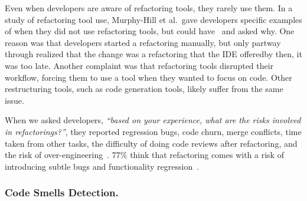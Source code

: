 \documentclass[runningheads,a4paper]{llncs}
\begin{document}
Even when developers are aware of refactoring tools, they rarely use them.  In a study of refactoring tool use, Murphy-Hill et al.~gave developers specific examples of when they did not use refactoring tools, but could have~\cite{Murphy-Hill2012:refactor} and asked why. One reason was that developers started a refactoring manually, but only partway through realized that the change was a refactoring that the IDE offered\textemdash by then, it was too late.  Another complaint was that refactoring tools disrupted their workflow, forcing them to use a tool when they wanted to focus on code.  Other restructuring tools, such as code generation tools, likely suffer from the same issue.  

When we asked developers, {\it ``based on your experience, what are the risks involved in refactorings?''}, they reported regression bugs, code churn, merge conflicts, time taken from other tasks, the difficulty of doing code reviews after refactoring, and the risk of over-engineering~\cite{Kim2012:FSR}. 77\% think that refactoring comes with a risk of introducing subtle bugs and functionality regression~\cite{Kim2012:FSR}.

\subsubsection{Code Smells Detection.} 
\end{document}
